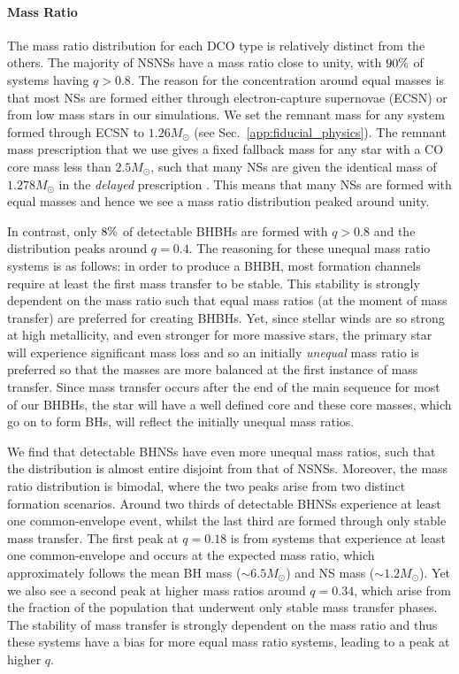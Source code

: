\paragraph{Mass Ratio} The mass ratio distribution for each DCO type is relatively distinct from the others. The majority of NSNSs have a mass ratio close to unity, with $90\%{}$ of systems having $q > 0.8$. The reason for the concentration around equal masses is that most NSs are formed either through electron-capture supernovae (ECSN) or from low mass stars in our simulations. We set the remnant mass for any system formed through ECSN to $1.26 \unit{M_{\odot}}$ (see Sec.~\ref{app:fiducial_physics}). The remnant mass prescription that we use gives a fixed fallback mass for any star with a CO core mass less than $2.5 \unit{M_\odot}$, such that many NSs are given the identical mass of $1.278 \unit{M_\odot}$ in the \textit{delayed} prescription \citep[see][Eq.~19]{Fryer+2012}. This means that many NSs are formed with equal masses and hence we see a mass ratio distribution peaked around unity.

In contrast, only $8\%{}$ of detectable BHBHs are formed with $q > 0.8$ and the distribution peaks around $q = 0.4$. The reasoning for these unequal mass ratio systems is as follows: in order to produce a BHBH, most formation channels require at least the first mass transfer to be stable. This stability is strongly dependent on the mass ratio such that equal mass ratios (at the moment of mass transfer) are preferred for creating BHBHs. Yet, since stellar winds are so strong at high metallicity, and even stronger for more massive stars, the primary star will experience significant mass loss and so an initially \textit{unequal} mass ratio is preferred so that the masses are more balanced at the first instance of mass transfer. Since mass transfer occurs after the end of the main sequence for most of our BHBHs, the star will have a well defined core and these core masses, which go on to form BHs, will reflect the initially unequal mass ratios.

We find that detectable BHNSs have even more unequal mass ratios, such that the distribution is almost entire disjoint from that of NSNSs. Moreover, the mass ratio distribution is bimodal, where the two peaks arise from two distinct formation scenarios. Around two thirds of detectable BHNSs experience at least one common-envelope event, whilst the last third are formed through only stable mass transfer. The first peak at $q = 0.18$ is from systems that experience at least one common-envelope and occurs at the expected mass ratio, which approximately follows the mean BH mass ($\sim 6.5 \unit{M_\odot}$) and NS mass ($\sim 1.2 \unit{M_\odot}$). Yet we also see a second peak at higher mass ratios around $q = 0.34$, which arise from the fraction of the population that underwent only stable mass transfer phases. The stability of mass transfer is strongly dependent on the mass ratio and thus these systems have a bias for more equal mass ratio systems, leading to a peak at higher $q$.

